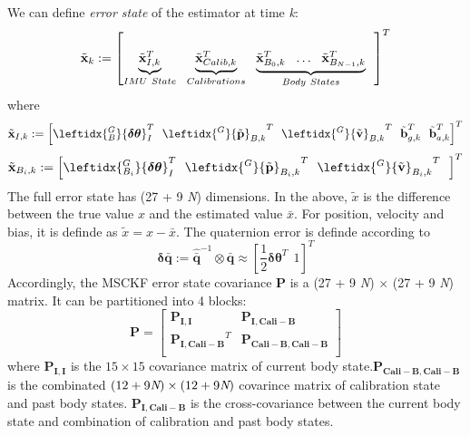 \documentclass[a4paper, 10pt, conference]{ieeeconf}      %
\begin{document}
We can  define \emph {error state} of the estimator  at time \emph k:
\begin {equation}
\tilde {\textbf x}_k :=\left[ \underbrace{ {{\tilde{\textbf x}}_{I,k}}^{ T} }_{IMU \ State}  \ \
\underbrace{ {{\tilde{\textbf x}}_{Calib,k}}^{ T} }_{Calibrations} \ \
\underbrace{ {{\tilde{\textbf x}}_{B_0,k}}^{ T}  \ \
\ldots \ \
{{\tilde{\textbf x}}_{B_{N-1},k}}^{ T} }_{Body \ States} \ \
\right]^T
\end{equation}
where
\begin {equation}
\tilde{\textbf x}_{I,k} :=\left[  \leftidx{_B^G} { \bm {\delta \theta}}_{I}^T \ \
{\leftidx{^G}{\tilde {\textbf p}}_{B,k}}^T \ \
{\leftidx{^G}{\tilde {\textbf v}}_{B,k}}^T \ \
\tilde {\textbf  b}_{g,k}^T\ \
\tilde {\textbf b}_{a,k}^T 
\right]^T
\end{equation}
\begin {equation}
\tilde{\textbf x}_{B_i,k} :=\left[  \leftidx{_{B_i}^G} { \bm {\delta \theta}}_{I}^T \ \
{\leftidx{^G}{\tilde {\textbf p}}_{B_i,k}}^T \ \
{\leftidx{^G}{\tilde {\textbf v}}_{B_i,k}}^T \ \
\right]^T
\end{equation}
The full error state has  (27 + 9 \emph N) dimensions. In the above, $ \tilde x $ is the difference between the true value $ x $ and the estimated
value $ \bar x $. For position, velocity and bias, it is definde as $ \tilde x  = x - \bar x $. The quaternion error is definde  according to 
\begin {equation}
\bm { \delta {\bar q}} := \bm{\hat{\bar q}}^{-1} \otimes \bm {  {\bar q}} \approx \left[\frac{1}{2}{ \bm {\delta \theta}}^T  \ \ 1\right]^T
\end{equation}
Accordingly, the MSCKF error state covariance $ \bm{P} $ is a (27 + 9 \emph N) $ \times $ (27 + 9 \emph N) matrix. It can be partitioned into 4 blocks:
\begin{equation}
\bm{P} = \left[  \begin{matrix} 
\bm{P_{I,I}}  &\bm{P_{I,Cali-B}}  \\
\bm{P_{I,Cali-B}}^T & \bm{P_{Cali-B,Cali-B}}  \\
\end{matrix}   \right] 
\end{equation}
where $ \bm{P_{I,I}} $ is the $ 15 \times 15 $ covariance matrix of current body state.$  \bm{P_{Cali-B,Cali-B}}$ is the combinated $ (12 + 9 \emph N) \times (12 + 9 \emph N )  $   covarince matrix of calibration state and past body states. $\bm{P_{I,Cali-B}}  $ is the cross-covariance
between the current body  state and combination of calibration and past body states.
  
\end{document}
